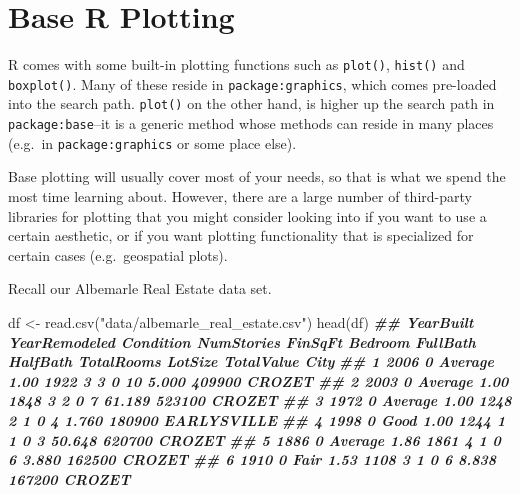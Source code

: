 \documentclass[
  12pt,
  krantz2]{krantz}
\makeatletter
\newenvironment{Shaded}{\begin{snugshade}}{\end{snugshade}}
\newcommand{\DocumentationTok}[1]{\textcolor[rgb]{0.37,0.37,0.37}{\textbf{\textit{#1}}}}
\newcommand{\FunctionTok}[1]{\textcolor[rgb]{0,0,0}{#1}}
\newcommand{\NormalTok}[1]{#1}
\newcommand{\OtherTok}[1]{\textcolor[rgb]{0.37,0.37,0.37}{#1}}
\newcommand{\StringTok}[1]{\textcolor[rgb]{0.5,0.5,0.5}{#1}}
\newenvironment{kframe}{%
\medskip{}
\setlength{\fboxsep}{.8em}
 \def\at@end@of@kframe{}%
 \ifinner\ifhmode%
  \def\at@end@of@kframe{\end{minipage}}%
  \begin{minipage}{\columnwidth}%
 \fi\fi%
 \def\FrameCommand##1{\hskip\@totalleftmargin \hskip-\fboxsep
 \colorbox{shadecolor}{##1}\hskip-\fboxsep
     \hskip-\linewidth \hskip-\@totalleftmargin \hskip\columnwidth}%
 \MakeFramed {\advance\hsize-\width
   \@totalleftmargin\z@ \linewidth\hsize
   \@setminipage}}%
 {\par\unskip\endMakeFramed%
 \at@end@of@kframe}
\renewenvironment{Shaded}{\begin{kframe}}{\end{kframe}}
\makeatother
\begin{document}
\hypertarget{base-r-plotting}{%
\section{Base R Plotting}\label{base-r-plotting}}

R comes with some built-in plotting functions such as \texttt{plot()}, \texttt{hist()} and \texttt{boxplot()}. Many of these reside in \texttt{package:graphics}, which comes pre-loaded into the search path. \texttt{plot()} on the other hand, is higher up the search path in \texttt{package:base}--it is a generic method whose methods can reside in many places (e.g.~in \texttt{package:graphics} or some place else).

Base plotting will usually cover most of your needs, so that is what we spend the most time learning about. However, there are a large number of third-party libraries for plotting that you might consider looking into if you want to use a certain aesthetic, or if you want plotting functionality that is specialized for certain cases (e.g.~geospatial plots).

Recall our Albemarle Real Estate data set.

\begin{Shaded}
\begin{Highlighting}[]
\NormalTok{df }\OtherTok{\textless{}{-}} \FunctionTok{read.csv}\NormalTok{(}\StringTok{"data/albemarle\_real\_estate.csv"}\NormalTok{)}
\FunctionTok{head}\NormalTok{(df)}
\DocumentationTok{\#\#   YearBuilt YearRemodeled Condition NumStories FinSqFt Bedroom FullBath HalfBath TotalRooms LotSize TotalValue        City}
\DocumentationTok{\#\# 1      2006             0   Average       1.00    1922       3        3        0         10   5.000     409900      CROZET}
\DocumentationTok{\#\# 2      2003             0   Average       1.00    1848       3        2        0          7  61.189     523100      CROZET}
\DocumentationTok{\#\# 3      1972             0   Average       1.00    1248       2        1        0          4   1.760     180900 EARLYSVILLE}
\DocumentationTok{\#\# 4      1998             0      Good       1.00    1244       1        1        0          3  50.648     620700      CROZET}
\DocumentationTok{\#\# 5      1886             0   Average       1.86    1861       4        1        0          6   3.880     162500      CROZET}
\DocumentationTok{\#\# 6      1910             0      Fair       1.53    1108       3        1        0          6   8.838     167200      CROZET}
\end{Highlighting}
\end{Shaded}
\end{document}
